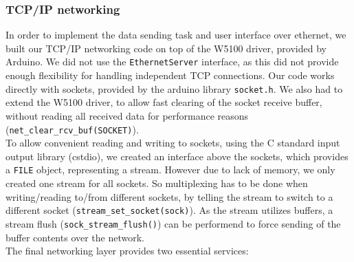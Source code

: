 \documentclass[a4paper]{scrreprt}
\begin{document}
\subsubsection{TCP/IP networking}
In order to implement the data sending task and user interface over ethernet, we built our TCP/IP networking code on top of the W5100 driver, provided by Arduino. We did not use the \texttt{EthernetServer} interface, as
this did not provide enough flexibility for handling independent TCP connections. Our code works directly with sockets, provided by
the arduino library \texttt{socket.h}. We also had to extend the W5100 driver, to allow fast clearing of the socket receive buffer,
without reading all received data for performance reasons (\texttt{net\_clear\_rcv\_buf(SOCKET)}).\\
To allow convenient reading and writing to sockets, using the C standard input output library (cstdio), we created an interface
above the sockets, which provides a \texttt{FILE} object, representing a stream. However due to lack of memory, we only created one
stream for all sockets. So multiplexing has to be done when writing/reading to/from different sockets, by telling the stream to switch
to a different socket (\texttt{stream\_set\_socket(sock)}). As the stream utilizes buffers, a stream flush (\texttt{sock\_stream\_flush()})
can be performend to force sending of the buffer contents over the network.\\
The final networking layer provides two essential services:
\end{document}
